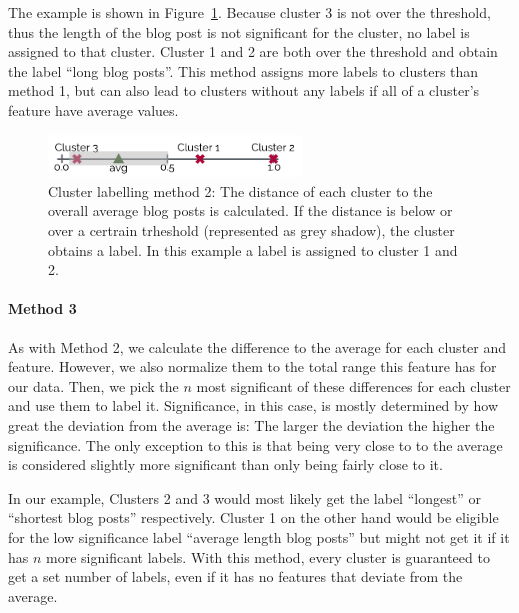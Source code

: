 The example is shown in Figure~\ref{cluster_labeling_2}.
Because cluster 3 is not over the threshold, thus the length of the blog post is not significant for the cluster, no label is assigned to that cluster.
Cluster 1 and 2 are both over the threshold and obtain the label ``long blog posts''.
This method assigns more labels to clusters than method 1, but can also lead to clusters without any labels if all of a cluster's feature have average values.

\begin{figure}[ht]
	\centering
	\includegraphics[width=0.6\textwidth]{images/cluster_labeling_2.pdf}
	\caption{Cluster labelling method 2: The distance of each cluster to the overall average blog posts is calculated. If the distance is below or over a certrain trheshold (represented as grey shadow), the cluster obtains a label. In this example a label is assigned to cluster 1 and 2.}
	\label{cluster_labeling_2}
\end{figure}

\paragraph{Method 3}
As with Method 2, we calculate the difference to the average for each cluster and feature.
However, we also normalize them to the total range this feature has for our data.
Then, we pick the $n$ most significant of these differences for each cluster and use them to label it.
Significance, in this case, is mostly determined by how great the deviation from the average is: The larger the deviation the higher the significance.
The only exception to this is that being very close to to the average is considered slightly more significant than only being fairly close to it.

In our example, Clusters 2 and 3 would most likely get the label ``longest'' or ``shortest blog posts'' respectively.
Cluster 1 on the other hand would be eligible for the low significance label ``average length blog posts'' but might not get it if it has $n$ more significant labels.
With this method, every cluster is guaranteed to get a set number of labels, even if it has no features that deviate from the average.
